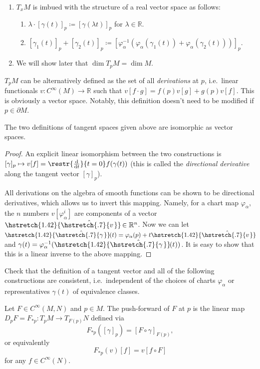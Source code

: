 \documentclass[english,letterpaper]{article}%
\numberwithin{equation}{section}
\numberwithin{figure}{section}
\numberwithin{table}{section}
\theoremstyle{definition}
\theoremstyle{definition}
\theoremstyle{definition}
\theoremstyle{plain}
\theoremstyle{plain}
\theoremstyle{plain}
\theoremstyle{plain}
\theoremstyle{remark}
\theoremstyle{remark}
\newcommand{\dd}{{\mathrm{d}}}
\newcommand\wh[1]{\hstretch{1.42}{\hat{\hstretch{.7}{#1\mkern2mu}}}\mkern-2mu} %
\begin{document}
\begin{enumerate}
    \item $T_x M$ is imbued with the structure of a real vector space as follows:
    \begin{enumerate}
        \item $\lambda\cdot [\gamma(t)]_p\coloneqq [\gamma(\lambda t)]_p$ for $\lambda\in\mathbb{R}$.
        \item $[\gamma_1(t)]_p+[\gamma_2(t)]_p\coloneqq [\varphi_\alpha^{-1}(\varphi_\alpha(\gamma_1(t))+\varphi_\alpha(\gamma_2(t)))]_p.$
    \end{enumerate}
    \item We will show later that $\dim T_p M=\dim M$.
\end{enumerate}


\begin{defn}
$T_p M$ can be alternatively defined as the set of all \emph{derivations} at $p$, i.e.\ linear functionals $v:C^\infty(M)\to \mathbb{R}$ such that $v[f\cdot g]=f(p)v[g]+g(p)v[f]$. This is obviously a vector space. Notably, this definition doesn't need to be modified if $p\in\partial M$.
\end{defn}

\begin{prop}
The two definitions of tangent spaces given above are isomorphic as vector spaces.
\end{prop}
\begin{proof}
An explicit linear isomorphism between the two constructions is $[\gamma]_p\mapsto v[f]=\restr{\frac{\dd}{\dd t}}{t=0}f(\gamma(t))$ (this is called the \emph{directional derivative} along the tangent vector $[\gamma]_p$). 

All derivations on the algebra of smooth functions can be shown to be directional derivatives, which allows us to invert this mapping. Namely, for a chart map $\varphi_\alpha$, the $n$ numbers $v[\varphi_\alpha^i]$ are components of a vector $\wh{v}\in \mathbb{R}^n$. Now we can let $\wh{\gamma}(t)=\varphi_\alpha(p)+t\wh{v}$ and $\gamma(t)=\varphi_\alpha^{-1}(\wh{\gamma}(t))$. It is easy to show that this is a linear inverse to the above mapping.
\end{proof}


\begin{xca}
Check that the definition of a tangent vector and all of the following constructions are consistent, i.e.\ independent of the choices of charts $\varphi_\alpha$ or representatives $\gamma(t)$ of equivalence classes.
\end{xca}
\begin{defn}
Let $F\in C^\infty(M,N)$ and $p\in M$. The push-forward of $F$ at $p$ is the linear map $D_p F=F_{\ast p}:T_p M\to T_{F(p)} N$ defined via \[F_{\ast p}([\gamma]_p)=[F\circ\gamma]_{F(p)},\] or equivalently \[F_{\ast p}(v)[f]=v[f\circ F]\] for any $f\in C^\infty (N)$.
\end{defn}
\end{document}
